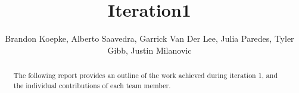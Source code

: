 \begin{frontmatter}
	\title{Iteration1}
	\author{Brandon Koepke, Alberto Saavedra, Garrick Van Der Lee, Julia Paredes, Tyler Gibb, Justin Milanovic}
	\begin{abstract}
		The following report provides an outline of the work achieved during iteration 1, and the individual contributions of each team member.
	\end{abstract}
\end{frontmatter}
\tableofcontents
\listoffigures
\clearpage
